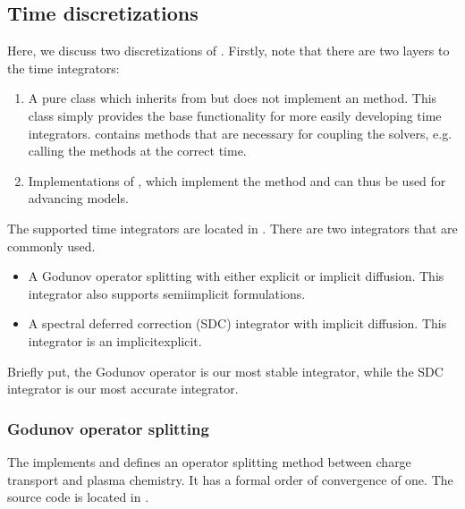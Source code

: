 \documentclass[letterpaper,10pt,english]{sphinxmanual}
\begin{document}
\subsection{Time discretizations}
\label{\detokenize{Applications/CdrPlasmaModel:time-discretizations}}
Here, we discuss two discretizations of .
Firstly, note that there are two layers to the time integrators:
\begin{enumerate}
%
\item {} 
A pure class  which inherits from  but does not implement an  method.
This class simply provides the base functionality for more easily developing time integrators.
 contains methods that are necessary for coupling the solvers, e.g. calling the  methods at the correct time.

\item {} 
Implementations of , which implement the  method and can thus be used for advancing models.

\end{enumerate}

The supported time integrators are located in .
There are two integrators that are commonly used.
\begin{itemize}
\item {} 
A Godunov operator splitting with either explicit or implicit diffusion.
This integrator also supports semi\sphinxhyphen{}implicit formulations.

\item {} 
A spectral deferred correction (SDC) integrator with implicit diffusion.
This integrator is an implicit\sphinxhyphen{}explicit.

\end{itemize}

Briefly put, the Godunov operator is our most stable integrator, while the SDC integrator is our most accurate integrator.


\subsubsection{Godunov operator splitting}
\label{\detokenize{Applications/CdrPlasmaModel:godunov-operator-splitting}}\label{\detokenize{Applications/CdrPlasmaModel:chap-godunov}}
The  implements  and defines an operator splitting method between charge transport and plasma chemistry.
It has a formal order of convergence of one.
The source code is located in .
\end{document}
